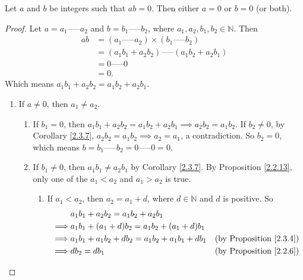 \begin{proposition}\label{4.1.8}
Let \(a\) and \(b\) be integers such that \(ab = 0\).
Then either \(a = 0\) or \(b = 0\) (or both).
\end{proposition}

\begin{proof}
Let \(a = a_1 \text{-----} a_2\) and \(b = b_1 \text{-----} b_2\), where \(a_1, a_2, b_1, b_2 \in \mathds{N}\).
Then
\begin{align*}
ab &= (a_1 \text{-----} a_2) \times (b_1 \text{-----} b_2) \\
&= (a_1b_1 + a_2b_2) \text{-----} (a_1b_2 + a_2b_1) \\
&= 0 \text{-----} 0 \\
&= 0.
\end{align*}
Which means \(a_1b_1 + a_2b_2 = a_1b_2 + a_2b_1\).
    \begin{enumerate}
        \item If \(a \neq 0\), then \(a_1 \neq a_2\).
            \begin{enumerate}[label=(\roman*)]
                \item If \(b_1 = 0\), then \(a_1b_1 + a_2b_2 = a_1b_2 + a_2b_1 \implies a_2b_2 = a_1b_2\).
                If \(b_2 \neq 0\), by Corollary \ref{2.3.7}, \(a_2b_2 = a_1b_2 \implies a_2 = a_1\), a contradiction.
                So \(b_2 = 0\), which means \(b = b_1 \text{-----} b_2 = 0 \text{-----} 0 = 0\).
                \item If \(b_1 \neq 0\), then \(a_1b_1 \neq a_2b_1\) by Corollary \ref{2.3.7}.
                By Proposition \ref{2.2.13}, only one of the \(a_1 < a_2\) and \(a_1 > a_2\) is true.
                \begin{enumerate}[label=(\arabic*)]
                    \item If \(a_1 < a_2\), then \(a_2 = a_1 + d\), where \(d \in \mathds{N}\) and \(d\) is positive.
                    So
                        \begin{align*}
                            & a_1b_1 + a_2b_2 = a_1b_2 + a_2b_1 \\
                            \implies & a_1b_1 + (a_1 + d)b_2 = a_1b_2 + (a_1 + d)b_1 \\
                            \implies & a_1b_1 + a_1b_2 + db_2 = a_1b_2 + a_1b_1 + db_1 & \text{(by Proposition \ref{2.3.4})} \\
                            \implies & db_2 = db_1 & \text{(by Proposition \ref{2.2.6})} \\

\end{align*}
\end{enumerate}
\end{enumerate}
\end{enumerate}
\end{proof}
